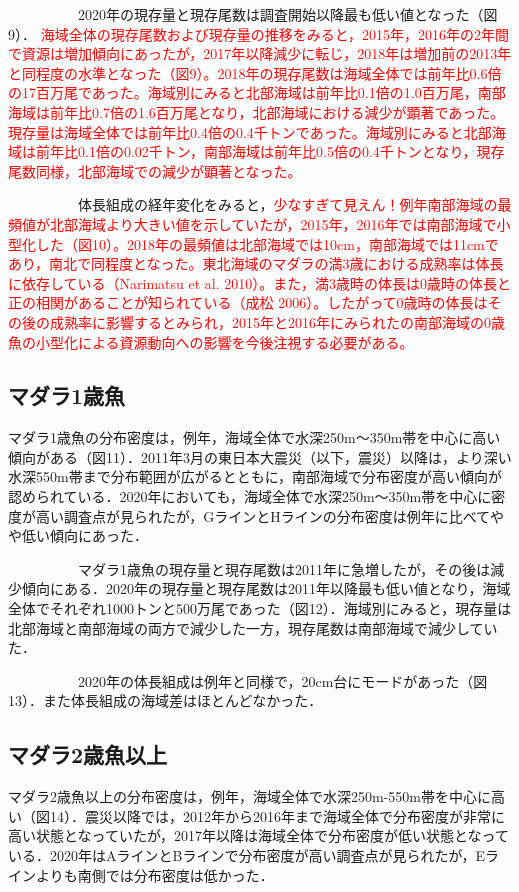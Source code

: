 \documentclass[11pt]{article} %
\begin{document}
\begin{linenumbers}
\ \ \ \ \ \ \ \ \ \ 
2020年の現存量と現存尾数は調査開始以降最も低い値となった（図9）．\textcolor{red}{
海域全体の現存尾数および現存量の推移をみると，2015年，2016年の2年間で資源は増加傾向にあったが，2017年以降減少に転じ，2018年は増加前の2013年と同程度の水準となった（図9）。2018年の現存尾数は海域全体では前年比0.6倍の17百万尾であった。海域別にみると北部海域は前年比0.1倍の1.0百万尾，南部海域は前年比0.7倍の1.6百万尾となり，北部海域における減少が顕著であった。現存量は海域全体では前年比0.4倍の0.4千トンであった。海域別にみると北部海域は前年比0.1倍の0.02千トン，南部海域は前年比0.5倍の0.4千トンとなり，現存尾数同様，北部海域での減少が顕著となった。}

\ \ \ \ \ \ \ \ \ \ 
体長組成の経年変化をみると，\textcolor{red}{少なすぎて見えん！例年南部海域の最頻値が北部海域より大きい値を示していたが，2015年，2016年では南部海域で小型化した（図10）。2018年の最頻値は北部海域では10cm，南部海域では11cmであり，南北で同程度となった。東北海域のマダラの満3歳における成熟率は体長に依存している（Narimatsu et al. 2010）。また，満3歳時の体長は0歳時の体長と正の相関があることが知られている（成松 2006）。したがって0歳時の体長はその後の成熟率に影響するとみられ，2015年と2016年にみられたの南部海域の0歳魚の小型化による資源動向への影響を今後注視する必要がある。}

\subsection{マダラ1歳魚}
マダラ1歳魚の分布密度は，例年，海域全体で水深250m～350m帯を中心に高い傾向がある（図11）．2011年3月の東日本大震災（以下，震災）以降は，より深い水深550m帯まで分布範囲が広がるとともに，南部海域で分布密度が高い傾向が認められている．2020年においても，海域全体で水深250m～350m帯を中心に密度が高い調査点が見られたが，GラインとHラインの分布密度は例年に比べてやや低い傾向にあった．

\ \ \ \ \ \ \ \ \ \ 
マダラ1歳魚の現存量と現存尾数は2011年に急増したが，その後は減少傾向にある．2020年の現存量と現存尾数は2011年以降最も低い値となり，海域全体でそれぞれ1000トンと500万尾であった（図12）．海域別にみると，現存量は北部海域と南部海域の両方で減少した一方，現存尾数は南部海域で減少していた．

\ \ \ \ \ \ \ \ \ \ 
2020年の体長組成は例年と同様で，20cm台にモードがあった（図13）．また体長組成の海域差はほとんどなかった．

\subsection{マダラ2歳魚以上}
マダラ2歳魚以上の分布密度は，例年，海域全体で水深250m-550m帯を中心に高い（図14）．震災以降では，2012年から2016年まで海域全体で分布密度が非常に高い状態となっていたが，2017年以降は海域全体で分布密度が低い状態となっている．2020年はAラインとBラインで分布密度が高い調査点が見られたが，Eラインよりも南側では分布密度は低かった．


\end{linenumbers}
\end{document}
